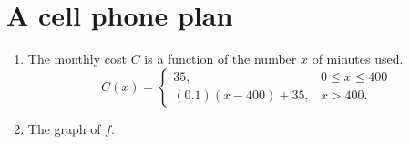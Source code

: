 \documentclass[12pt]{article}
\begin{document}
\section{A cell phone plan}
\begin{enumerate}
\item The monthly cost $C$ is a function of the number $x$ of minutes used.
\begin{equation}
C(x)=\begin{cases}
    35,&0\leq x\leq 400\\
    (0.1)(x-400)+35,&x>400.
\end{cases}
\end{equation}
\item The graph of $f$.
\begin{center}
\end{center}
\end{enumerate}
\end{document}
